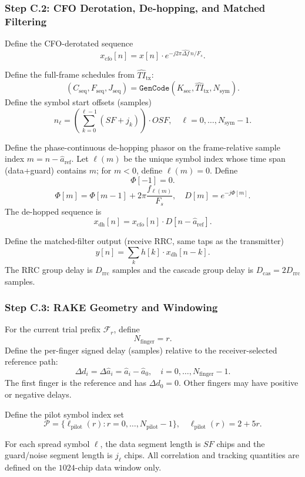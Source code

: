 \documentclass[11pt]{article}
\begin{document}
\subsubsection{Step C.2: CFO Derotation, De-hopping, and Matched Filtering}

Define the CFO-derotated sequence
\[
  x_{\text{cfo}}[n]=x[n]\cdot e^{-j2\pi\widehat{\Delta f}\,n/F_s}.
\]

Define the full-frame schedules from $\widehat{\mathit{TI}}_{\text{tx}}$:
\[
  (C_{\text{seq}}, F_{\text{seq}}, J_{\text{seq}})=\texttt{GenCode}(K_{\text{sec}}, \widehat{\mathit{TI}}_{\text{tx}}, N_{\text{sym}}).
\]
Define the symbol start offsets (samples)
\[
  n_\ell = \left(\sum_{k=0}^{\ell-1} (\mathit{SF}+j_k)\right)\cdot \mathit{OSF},\quad \ell=0,\dots,N_{\text{sym}}-1.
\]

Define the phase-continuous de-hopping phasor on the frame-relative sample index $m=n-\hat a_{\text{ref}}$. Let $\ell(m)$ be the unique symbol index whose time span (data+guard) contains $m$; for $m<0$, define $\ell(m)=0$. Define
\[
  \Phi[-1]=0.
\]
\[
  \Phi[m]=\Phi[m-1]+2\pi\frac{f_{\ell(m)}}{F_s},\quad D[m]=e^{-j\Phi[m]}.
\]
The de-hopped sequence is
\[
  x_{\text{dh}}[n]=x_{\text{cfo}}[n]\cdot D[n-\hat a_{\text{ref}}].
\]

Define the matched-filter output (receive RRC, same taps as the transmitter)
\[
  y[n]=\sum_k h[k]\cdot x_{\text{dh}}[n-k].
\]
The RRC group delay is $D_{\text{rrc}}$ samples and the cascade group delay is $D_{\text{cas}}=2D_{\text{rrc}}$ samples.

\subsubsection{Step C.3: RAKE Geometry and Windowing}

For the current trial prefix $\mathcal{F}_r$, define
\[
  N_{\text{finger}}=r.
\]
Define the per-finger signed delay (samples) relative to the receiver-selected reference path:
\[
  \Delta d_i = \Delta\hat a_i = \hat a_i-\hat a_0,
  \quad i=0,\dots,N_{\text{finger}}-1.
\]
The first finger is the reference and has $\Delta d_0=0$. Other fingers may have positive or
negative delays.

Define the pilot symbol index set
\[
  \mathcal{P}=\{\ell_{\text{pilot}}(r): r=0,\dots,N_{\text{pilot}}-1\},\quad \ell_{\text{pilot}}(r)=2+5r.
\]

For each spread symbol $\ell$, the data segment length is $\mathit{SF}$ chips and the guard/noise segment length is $j_\ell$ chips. All correlation and tracking quantities are defined on the $1024$-chip data window only.
\end{document}
